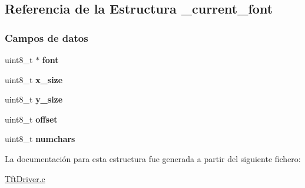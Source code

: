 \hypertarget{struct__current__font}{}\subsection{Referencia de la Estructura \+\_\+current\+\_\+font}
\label{struct__current__font}
\subsubsection*{Campos de datos}
\begin{DoxyCompactItemize}
\item 
uint8\+\_\+t $\ast$ {\bfseries font}\hypertarget{struct__current__font_a713cf549ac36d623e13698a1b8d06488}{}\label{struct__current__font_a713cf549ac36d623e13698a1b8d06488}

\item 
uint8\+\_\+t {\bfseries x\+\_\+size}\hypertarget{struct__current__font_a49c9c37f5faf5d88b54733ed88b18eb8}{}\label{struct__current__font_a49c9c37f5faf5d88b54733ed88b18eb8}

\item 
uint8\+\_\+t {\bfseries y\+\_\+size}\hypertarget{struct__current__font_a06ce89c622057653bb64a814b65f5b3e}{}\label{struct__current__font_a06ce89c622057653bb64a814b65f5b3e}

\item 
uint8\+\_\+t {\bfseries offset}\hypertarget{struct__current__font_ab1f8128aa0436d0b0e90502b9dbadb9d}{}\label{struct__current__font_ab1f8128aa0436d0b0e90502b9dbadb9d}

\item 
uint8\+\_\+t {\bfseries numchars}\hypertarget{struct__current__font_aa2d9fdee2e9a9e2b4dd4f2a0aa2a65a7}{}\label{struct__current__font_aa2d9fdee2e9a9e2b4dd4f2a0aa2a65a7}

\end{DoxyCompactItemize}


La documentación para esta estructura fue generada a partir del siguiente fichero\+:\begin{DoxyCompactItemize}
\item 
\hyperlink{TftDriver_8c}{Tft\+Driver.\+c}\end{DoxyCompactItemize}
